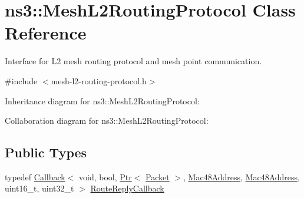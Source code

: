 \hypertarget{classns3_1_1MeshL2RoutingProtocol}{}\section{ns3\+:\+:Mesh\+L2\+Routing\+Protocol Class Reference}
\label{classns3_1_1MeshL2RoutingProtocol}


Interface for L2 mesh routing protocol and mesh point communication.  




{\ttfamily \#include $<$mesh-\/l2-\/routing-\/protocol.\+h$>$}



Inheritance diagram for ns3\+:\+:Mesh\+L2\+Routing\+Protocol\+:


Collaboration diagram for ns3\+:\+:Mesh\+L2\+Routing\+Protocol\+:
\subsection*{Public Types}
\begin{DoxyCompactItemize}
\item 
typedef \hyperlink{classns3_1_1Callback}{Callback}$<$ void, bool, \hyperlink{classns3_1_1Ptr}{Ptr}$<$ \hyperlink{classns3_1_1Packet}{Packet} $>$, \hyperlink{classns3_1_1Mac48Address}{Mac48\+Address}, \hyperlink{classns3_1_1Mac48Address}{Mac48\+Address}, uint16\+\_\+t, uint32\+\_\+t $>$ \hyperlink{classns3_1_1MeshL2RoutingProtocol_a4c415efa22789b3a3bb5538b8fcf3e6a}{Route\+Reply\+Callback}
\end{DoxyCompactItemize}
